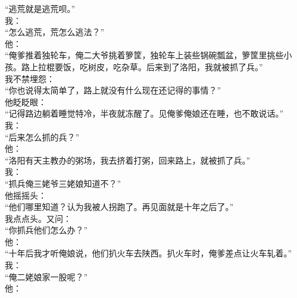 “逃荒就是逃荒呗。”\\

我：\\

“怎么逃荒，荒怎么逃法？”\\

他：\\

“俺爹推着独轮车，俺二大爷挑着箩筐，独轮车上装些锅碗瓢盆，箩筐里挑些小孩。路上拉棍要饭，吃树皮，吃杂草。后来到了洛阳，我就被抓了兵。”\\

我不禁埋怨：\\

“你也说得太简单了，路上就没有什么现在还记得的事情？”\\

他眨眨眼：\\

“记得路边躺着睡觉特冷，半夜就冻醒了。见俺爹俺娘还在睡，也不敢说话。”\\

我：\\

“后来怎么抓的兵？”\\

他：\\

“洛阳有天主教办的粥场，我去挤着打粥，回来路上，就被抓了兵。”\\

我：\\

“抓兵俺三姥爷三姥娘知道不？”\\

他摇摇头：\\

“他们哪里知道？认为我被人拐跑了。再见面就是十年之后了。”\\

我点点头。又问：\\

“你抓兵他们怎么办？”\\

他：\\

“十年后我才听俺娘说，他们扒火车去陕西。扒火车时，俺爹差点让火车轧着。”\\

我：\\

“俺二姥娘家一股呢？”\\

他：\\


